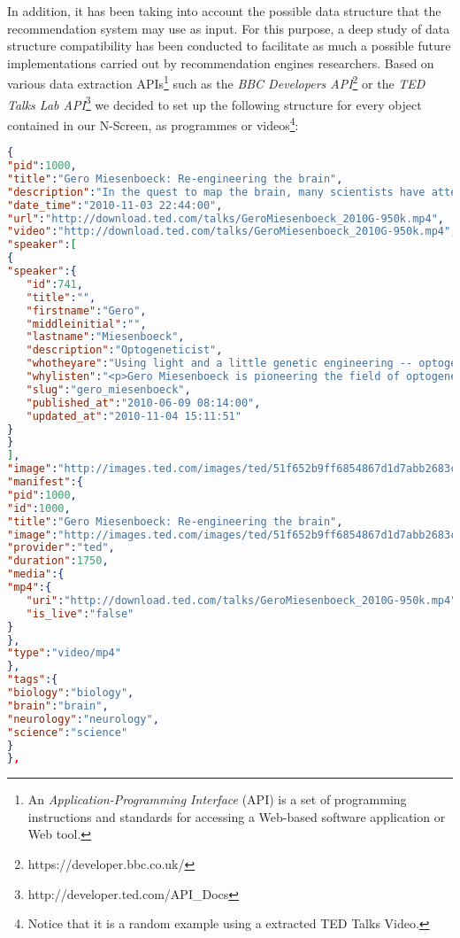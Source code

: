 \documentclass{acm_proc_article-sp}
\begin{document}
In addition, it has been taking into account the possible data structure that the recommendation system may use as input. For this purpose, a deep study of data structure compatibility has been conducted to facilitate as much a possible future implementations carried out by recommendation engines researchers. Based on various data extraction APIs\footnote{An \textit{Application-Programming Interface} (API) is a set of programming instructions and standards for accessing a Web-based software application or Web tool.} such as the \textit{BBC Developers API}\footnote{https://developer.bbc.co.uk/} or the \textit{TED Talks Lab API}\footnote{http://developer.ted.com/API\_Docs}
we decided to set up the following structure for every object contained in our N-Screen, as programmes or videos\footnote{Notice that it is a random example using a extracted TED Talks Video.}:
\begin{lstlisting}[language=json,firstnumber=1]
{
"pid":1000,
"title":"Gero Miesenboeck: Re-engineering the brain",
"description":"In the quest to map the brain, many scientists have attempted the incredibly daunting task of recording the activity of each neuron. Gero Miesenboeck works backward -- manipulating specific neurons to figure out exactly what they do, through a series of stunning experiments that reengineer the way fruit flies percieve light.",
"date_time":"2010-11-03 22:44:00",
"url":"http://download.ted.com/talks/GeroMiesenboeck_2010G-950k.mp4",
"video":"http://download.ted.com/talks/GeroMiesenboeck_2010G-950k.mp4",
"speaker":[
{
"speaker":{
   "id":741,
   "title":"",
   "firstname":"Gero",
   "middleinitial":"",
   "lastname":"Miesenboeck",
   "description":"Optogeneticist",
   "whotheyare":"Using light and a little genetic engineering -- optogenetics -- Gero Miesenboeck has developed a way to control how living nerve cells work, and advanced understanding of how the brain controls behavior.",
   "whylisten":"<p>Gero Miesenboeck is pioneering the field of optogenetics: genetically modifying nerve cells to respond to light. By flashing light at a modified neuron in a living nervous system, Miesenboeck and his collaborators can mimic a brain impulse -- and then study what happens next. Optogenetics will allow ever more precise experiments on living brains, allowing us to gather better evidence on how electrical impulses on tissue translate into actual behavior and thoughts...</p>",
   "slug":"gero_miesenboeck",
   "published_at":"2010-06-09 08:14:00",
   "updated_at":"2010-11-04 15:11:51"
}
}
],
"image":"http://images.ted.com/images/ted/51f652b9ff6854867d1d7abb2683caf1d8dd22fb_240x180.jpg",
"manifest":{
"pid":1000,
"id":1000,
"title":"Gero Miesenboeck: Re-engineering the brain",
"image":"http://images.ted.com/images/ted/51f652b9ff6854867d1d7abb2683caf1d8dd22fb_240x180.jpg",
"provider":"ted",
"duration":1750,
"media":{
"mp4":{
   "uri":"http://download.ted.com/talks/GeroMiesenboeck_2010G-950k.mp4",
   "is_live":"false"
}
},
"type":"video/mp4"
},
"tags":{
"biology":"biology",
"brain":"brain",
"neurology":"neurology",
"science":"science"
}
},
\end{lstlisting}
\end{document}
